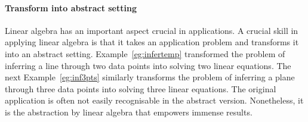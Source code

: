 \paragraph{Transform into abstract setting}
Linear algebra has an important aspect crucial in applications.
A crucial skill in applying linear algebra is that it takes an application problem and transforms it into an abstract setting.
Example~\ref{eg:infertemp} transformed the problem of inferring a line through two data points into solving two linear equations.
The next Example~\ref{eg:inf3pts} similarly transforms the problem of inferring a plane through three data points into solving three linear equations.
The original application is often not easily recognisable in the abstract version. 
Nonetheless, it is the abstraction by linear algebra that empowers immense results.


